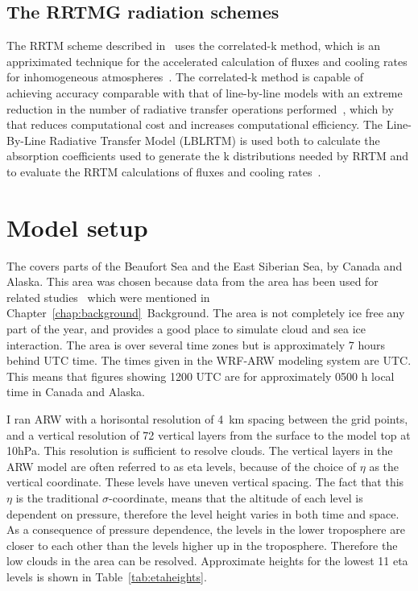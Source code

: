 \subsection{The RRTMG radiation schemes}
The RRTM scheme described in~\citet{Mlawer1997} uses the correlated-k method, which is an appriximated technique for the accelerated calculation of fluxes and cooling rates for inhomogeneous atmospheres~\citep{Mlawer1997}. %
The correlated-k method is capable of achieving accuracy comparable with that of line-by-line models with an extreme reduction in the number of radiative transfer operations performed~\citep{Mlawer1997}, which by that reduces computational cost and increases computational efficiency. The Line-By-Line Radiative Transfer Model (LBLRTM) is used both to calculate the absorption coefficients used to generate the k distributions needed by RRTM and  to evaluate the RRTM calculations of fluxes and cooling rates~\citep{Iacono2000}. 


\section{Model setup}
\label{sec:modelsetup}
The covers parts of the Beaufort Sea and the East Siberian Sea, by Canada and Alaska. This area was chosen because data from the area has been used for related studies~\citep{Intrieri2002,Shupe2004,Kay2009,Wu2012,Palm2010,Schweiger2008} %
which were mentioned in Chapter~\ref{chap:background}~Background.%
The area is not completely ice free any part of the year,%
 and provides a good place to simulate cloud and sea ice interaction. The area is over several time zones but is approximately 7 hours behind UTC time. The times given in the WRF-ARW modeling system are UTC. This means that figures showing 1200 UTC are for approximately 0500 h local time in Canada and Alaska.

I ran ARW with a horisontal resolution of 4~km spacing between the grid points, and a vertical resolution of 72 vertical layers from the surface to the model top at 10hPa. This resolution is sufficient to resolve clouds.%
The vertical layers in the ARW model are often referred to as eta levels, because of the choice of $\eta$ as the vertical coordinate. These levels have uneven vertical spacing. The fact that this $\eta$ is the traditional $\sigma$-coordinate, means that the altitude of each level is dependent on pressure, therefore the level height varies in both time and space. As a consequence of pressure dependence, the levels in the lower troposphere are closer to each other than the levels higher up in the troposphere. Therefore the low clouds in the area can be resolved. Approximate heights for the lowest 11 eta levels is shown in Table~\ref{tab:etaheights}.

